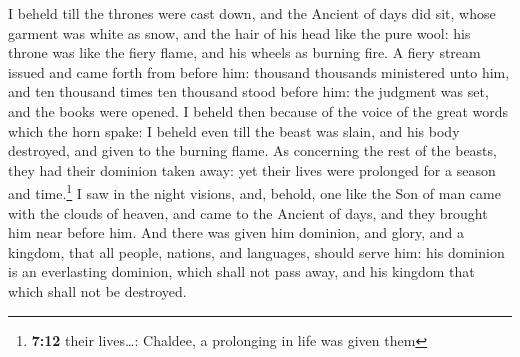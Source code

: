  I beheld till the thrones were cast down, and the Ancient
of days did sit, whose garment was white as snow, and the hair of his
head like the pure wool: his throne was like the fiery flame, and his
wheels as burning fire.  A fiery stream issued and came
forth from before him: thousand thousands ministered unto him, and ten
thousand times ten thousand stood before him: the judgment was set, and
the books were opened.  I beheld then because of the
voice of the great words which the horn spake: I beheld even till the
beast was slain, and his body destroyed, and given to the burning flame.
 As concerning the rest of the beasts, they had their
dominion taken away: yet their lives were prolonged for a season and
time.\footnote{\textbf{7:12} their lives\ldots: Chaldee, a prolonging in
  life was given them}  I saw in the night visions, and,
behold, one like the Son of man came with the clouds of heaven, and came
to the Ancient of days, and they brought him near before him.
 And there was given him dominion, and glory, and a
kingdom, that all people, nations, and languages, should serve him: his
dominion is an everlasting dominion, which shall not pass away, and his
kingdom that which shall not be destroyed.

